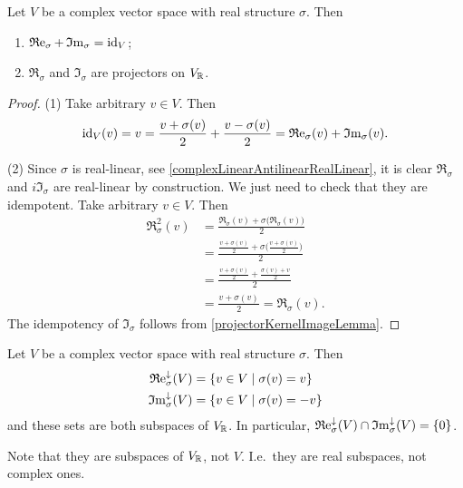 \begin{proposition} \label{realImaginaryPartsProjectors}
Let $V$ be a complex vector space with real structure $\sigma$. Then
\begin{enumerate}
\item $\operatorname{\mathfrak{R}e}_\sigma + \operatorname{\mathfrak{I}m}_\sigma = \operatorname{id}_V$;
\item $\Re_\sigma$ and $\Im_\sigma$ are projectors on $V_{\mathbb{R}}$.
\end{enumerate}
\end{proposition}
\begin{proof}
(1) Take arbitrary $v\in V$. Then
\[ \operatorname{id}_V(v) = v = \frac{v+\sigma(v)}{2} + \frac{v-\sigma(v)}{2} = \operatorname{\mathfrak{R}e}_\sigma(v) + \operatorname{\mathfrak{I}m}_\sigma(v). \]

(2) Since $\sigma$ is real-linear, see \ref{complexLinearAntilinearRealLinear}, it is clear $\Re_\sigma$ and $i\Im_\sigma$ are real-linear by construction. We just need to check that they are idempotent. Take arbitrary $v\in V$. Then
\begin{align*}
\Re_\sigma^2(v) &= \frac{\Re_\sigma(v)+ \sigma\big(\Re_\sigma(v)\big)}{2} \\
&= \frac{\frac{v+\sigma(v)}{2}+ \sigma\big(\frac{v+\sigma(v)}{2}\big)}{2} \\
&= \frac{\frac{v+\sigma(v)}{2}+ \frac{\sigma(v)+v}{2}}{2} \\
&= \frac{v+\sigma(v)}{2} = \Re_\sigma(v).
\end{align*}
The idempotency of $\Im_\sigma$ follows from \ref{projectorKernelImageLemma}.
\end{proof}

\begin{proposition} \label{descriptionRealImaginarySubspaces}
Let $V$ be a complex vector space with real structure $\sigma$. Then
\begin{align*}
\Re^\imf_\sigma(V) &= \setbuilder{v\in V}{\sigma(v) = v} \\
\Im^\imf_\sigma(V) &= \setbuilder{v\in V}{\sigma(v) = -v}
\end{align*}
and these sets are both subspaces of $V_{\mathbb{R}}$. In particular, $\operatorname{\mathfrak{R}e}^\downarrow_\sigma(V) \cap \operatorname{\mathfrak{I}m}^\downarrow_\sigma(V) = \{0\}$.
\end{proposition}
Note that they are subspaces of $V_{\mathbb{R}}$, not $V$. I.e.\ they are real subspaces, not complex ones.

